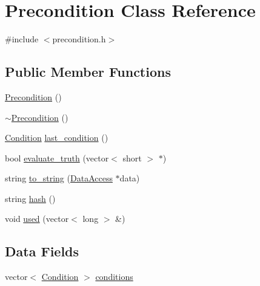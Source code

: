 \hypertarget{classPrecondition}{
\section{Precondition Class Reference}
\label{classPrecondition}
}


{\ttfamily \#include $<$precondition.h$>$}

\subsection*{Public Member Functions}
\begin{DoxyCompactItemize}
\item 
\hyperlink{classPrecondition_ab7e54d0ab9cbfb4b4a6cb03a20946207}{Precondition} ()
\item 
\hyperlink{classPrecondition_af8c382b226efa4b36e2d7c442dc20e72}{$\sim$Precondition} ()
\item 
\hyperlink{classCondition}{Condition} \hyperlink{classPrecondition_a0dc149f6a94c23abf08a226fe922e45a}{last\_\-condition} ()
\item 
bool \hyperlink{classPrecondition_a789430a3175b7e760d38e31e0aa0bd44}{evaluate\_\-truth} (vector$<$ short $>$ $\ast$)
\item 
string \hyperlink{classPrecondition_aedde69bd1559732cfefeb4160c1b184d}{to\_\-string} (\hyperlink{classDataAccess}{DataAccess} $\ast$data)
\item 
string \hyperlink{classPrecondition_a58cb7a26042379e7d7f32019c0086f8b}{hash} ()
\item 
void \hyperlink{classPrecondition_aec5f3333fee9d0d068f2d097d9c2f699}{used} (vector$<$ long $>$ \&)
\end{DoxyCompactItemize}
\subsection*{Data Fields}
\begin{DoxyCompactItemize}
\item 
vector$<$ \hyperlink{classCondition}{Condition} $>$ \hyperlink{classPrecondition_a0da73e4336a0abd5a3ab22e0e2099690}{conditions}
\end{DoxyCompactItemize}


